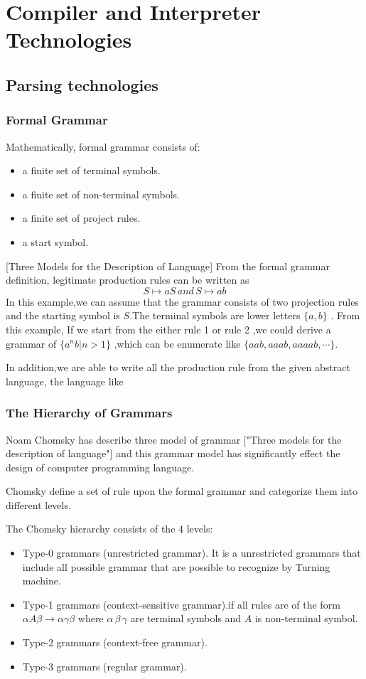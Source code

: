 \chapter{Compiler and Interpreter Technologies}
\section{Parsing technologies}
\subsection{Formal Grammar}

Mathematically, formal grammar consists of:
\begin{itemize}
\item a finite set of terminal symbols.
\item a finite set of non-terminal symbols.
\item a finite set of project rules.
\item a start symbol.
\end{itemize} \cite{aho1986compilers}
[Three Models for the Description of Language]
From the formal grammar definition, legitimate production rules can be written as 
 \[ S \mapsto aS  \,and \, S \mapsto ab \]
In this example,we can assume that the grammar consists of two projection rules and the starting symbol is $ S $.The terminal symbols are lower letters $ \{a ,b\} $ . From this example, If we start from the either rule 1 or rule 2 ,we could derive a  grammar of $ \{ a^n b | n>1  \}$ ,which can be enumerate like $ \{aab,aaab,aaaab,\cdots \} $.


In addition,we are able to write all the production rule from the given abstract language, the language like

\subsection{The Hierarchy of Grammars}
Noam Chomsky has describe three model of grammar ["Three models for the description of language"]  and this grammar model has significantly effect the design of computer programming language.


Chomsky define a set of rule upon the formal grammar and categorize them into different levels.

The Chomsky hierarchy consists of the 4 levels:
\begin{itemize}
\item Type-0 grammars (unrestricted grammar). It is a unrestricted grammars that include all possible grammar that are possible to recognize by Turning machine.
\item Type-1 grammars (context-sensitive grammar).if all rules are of the form $  \alpha A \beta \rightarrow \alpha \gamma \beta$ where $ \alpha \,  \beta \, \gamma $ are terminal symbols and $ A $ is non-terminal symbol.
\item Type-2 grammars (context-free grammar). 
\item Type-3 grammars (regular grammar).
\end{itemize}

